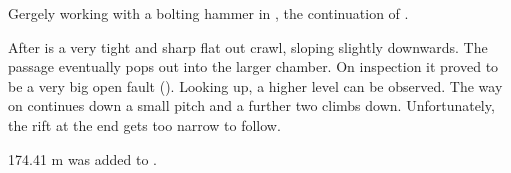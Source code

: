 \begin{marginfigure}
\checkoddpage \ifoddpage \forcerectofloat \else \forceversofloat \fi
\centering
 \caption{Gergely working with a bolting hammer in , the continuation of . }
 \label{gergely razor}
\end{marginfigure}

After  is a very tight and sharp flat out crawl,
sloping slightly downwards. The passage eventually pops out into the
larger chamber. On inspection it proved to be a very big open fault
(). Looking up, a higher level can be observed. The way on
continues down a small pitch and a further two climbs down.
Unfortunately, the rift at the end gets too narrow to follow.

174.41 m was added to .



